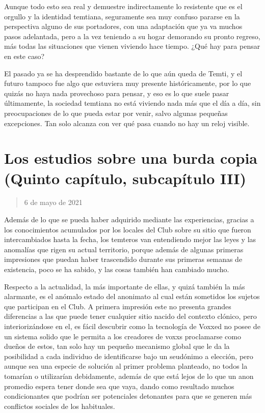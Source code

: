 \documentclass[
  spanish,
]{book}
\begin{document}
Aunque todo esto sea real y demuestre indirectamente lo resistente que es el orgullo y la identidad temtiana, seguramente sea muy confuso pararse en la perspectiva alguno de sus portadores, con una adaptación que ya va muchos pasos adelantada, pero a la vez teniendo a su hogar demorando su pronto regreso, más todas las situaciones que vienen viviendo hace tiempo. ¿Qué hay para pensar en este caso?

El pasado ya se ha desprendido bastante de lo que aún queda de Temti, y el futuro tampoco fue algo que estuviera muy presente históricamente, por lo que quizás no haya nada provechoso para pensar, y eso es lo que suele pasar últimamente, la sociedad temtiana no está viviendo nada más que el día a día, sin preocupaciones de lo que pueda estar por venir, salvo algunas pequeñas excepciones. Tan solo alcanza con ver qué pasa cuando no hay un reloj visible.

\hypertarget{los-estudios-sobre-una-burda-copia-quinto-capuxedtulo-subcapuxedtulo-iii}{%
\section{Los estudios sobre una burda copia (Quinto capítulo, subcapítulo III)}\label{los-estudios-sobre-una-burda-copia-quinto-capuxedtulo-subcapuxedtulo-iii}}

\begin{quote}
6 de mayo de 2021
\end{quote}

Además de lo que se pueda haber adquirido mediante las experiencias, gracias a los conocimientos acumulados por los locales del Club sobre su sitio que fueron intercambiados hasta la fecha, los temteros van entendiendo mejor las leyes y las anomalías que rigen su actual territorio, porque además de algunas primeras impresiones que puedan haber trascendido durante sus primeras semanas de existencia, poco se ha sabido, y las cosas también han cambiado mucho.

Respecto a la actualidad, la más importante de ellas, y quizá también la más alarmante, es el anómalo estado del anonimato al cual están sometidos los sujetos que participan en el Club. A primera impresión este no presenta grandes diferencias a las que puede tener cualquier sitio nacido del contexto clónico, pero interiorizándose en el, es fácil descubrir como la tecnología de Voxxed no posee de un sistema solido que le permita a los creadores de voxxs proclamarse como dueños de estos, tan solo hay un pequeño mecanismo global que le da la posibilidad a cada individuo de identificarse bajo un seudónimo a elección, pero aunque sea una especie de solución al primer problema planteado, no todos la tomarían o utilizarían debidamente, además de que está lejos de lo que un anon promedio espera tener donde sea que vaya, dando como resultado muchos condicionantes que podrían ser potenciales detonantes para que se generen más conflictos sociales de los habituales.
\end{document}
